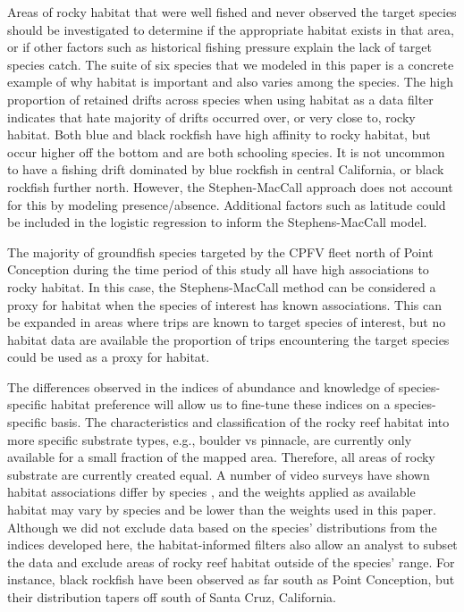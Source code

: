 \documentclass[
  12pt,
  authoryear,
  preprint,
  3p]{elsarticle}
\begin{document}
Areas of rocky habitat that were well fished and never observed the
target species should be investigated to determine if the appropriate
habitat exists in that area, or if other factors such as historical
fishing pressure explain the lack of target species catch. The suite of
six species that we modeled in this paper is a concrete example of why
habitat is important and also varies among the species. The high
proportion of retained drifts across species when using habitat as a
data filter indicates that hate majority of drifts occurred over, or
very close to, rocky habitat. Both blue and black rockfish have high
affinity to rocky habitat, but occur higher off the bottom and are both
schooling species. It is not uncommon to have a fishing drift dominated
by blue rockfish in central California, or black rockfish further north.
However, the Stephen-MacCall approach does not account for this by
modeling presence/absence. Additional factors such as latitude could be
included in the logistic regression to inform the Stephens-MacCall
model.

The majority of groundfish species targeted by the CPFV fleet north of
Point Conception during the time period of this study all have high
associations to rocky habitat. In this case, the Stephens-MacCall method
can be considered a proxy for habitat when the species of interest has
known associations. This can be expanded in areas where trips are known
to target species of interest, but no habitat data are available the
proportion of trips encountering the target species could be used as a
proxy for habitat.

The differences observed in the indices of abundance and knowledge of
species-specific habitat preference will allow us to fine-tune these
indices on a species-specific basis. The characteristics and
classification of the rocky reef habitat into more specific substrate
types, e.g., boulder vs pinnacle, are currently only available for a
small fraction of the mapped area. Therefore, all areas of rocky
substrate are currently created equal. A number of video surveys have
shown habitat associations differ by species \citep{Love:2002:RNP}, and
the weights applied as available habitat may vary by species and be
lower than the weights used in this paper. Although we did not exclude
data based on the species' distributions from the indices developed
here, the habitat-informed filters also allow an analyst to subset the
data and exclude areas of rocky reef habitat outside of the species'
range. For instance, black rockfish have been observed as far south as
Point Conception, but their distribution tapers off south of Santa Cruz,
California.
\end{document}
